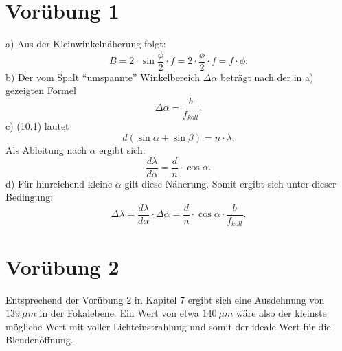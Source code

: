 \documentclass[titlepage]{scrartcl}
\begin{document}
\section{Vorübung 1}
a) Aus der Kleinwinkelnäherung folgt: 
\begin{equation}
B = 2\cdot \sin{\frac{\phi}{2}} \cdot f = 2 \cdot \frac{\phi}{2} \cdot f = f \cdot \phi.
\end{equation}
b) Der vom Spalt \enquote{umspannte} Winkelbereich $\Delta \alpha $ beträgt nach der in a) gezeigten Formel 
\begin{equation}
\Delta \alpha = \frac{b}{f_{koll}}.
\end{equation}
c) (10.1) lautet 
\begin{equation}
d(\sin \alpha  + \sin \beta) = n \cdot \lambda. 
\end{equation}
Als Ableitung nach $\alpha$ ergibt sich:
\begin{equation}
\frac{d\lambda}{d\alpha} = \frac{d}{n} \cdot \cos{\alpha}.
\end{equation}
d) Für hinreichend kleine $\alpha$ gilt diese Näherung. Somit ergibt sich unter dieser Bedingung:
\begin{equation}
\Delta \lambda = \frac{d\lambda}{d\alpha} \cdot \Delta \alpha = \frac{d}{n} \cdot \cos{\alpha} \cdot \frac{b}{f_{koll}}.
\end{equation} 
\section{Vorübung 2}
Entsprechend der Vorübung 2 in Kapitel 7 ergibt sich eine Ausdehnung von $139\ \mu m$ in der Fokalebene. Ein Wert von etwa $140\ \mu m$ wäre also der kleinste mögliche Wert mit voller Lichteinstrahlung und somit der ideale Wert für die Blendenöffnung. 
\end{document}
